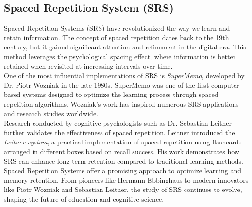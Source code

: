 \documentclass[12pt]{article}
\begin{document}
\subsection{Spaced Repetition System (SRS)}
Spaced Repetition Systems (SRS) have revolutionized the way we learn and retain information. The concept of spaced repetition dates back to the 19th century, but it gained significant attention and refinement in the digital era. This method leverages the psychological spacing effect, where information is better retained when revisited at increasing intervals over time. \\
One of the most influential implementations of SRS is \textit{SuperMemo}, developed by Dr. Piotr Wozniak in the late 1980s. SuperMemo was one of the first computer-based systems designed to optimize the learning process through spaced repetition algorithms. Wozniak's work has inspired numerous SRS applications and research studies worldwide.\\
Research conducted by cognitive psychologists such as Dr. Sebastian Leitner further validates the effectiveness of spaced repetition. Leitner introduced the \textit{Leitner system}, a practical implementation of spaced repetition using flashcards arranged in different boxes based on recall success. His work demonstrates how SRS can enhance long-term retention compared to traditional learning methods.\\
Spaced Repetition Systems offer a promising approach to optimize learning and memory retention. From pioneers like Hermann Ebbinghaus to modern innovators like Piotr Wozniak and Sebastian Leitner, the study of SRS continues to evolve, shaping the future of education and cognitive science.
\end{document}
